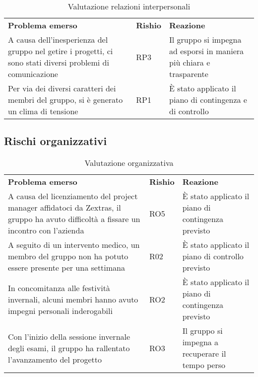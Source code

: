     \begin{table}[h]
        \begin{adjustbox}{width=\textwidth}
            \centering
            \renewcommand{\arraystretch}{1.1}
            \begin{tabular}{>{\centering\arraybackslash} m{5cm} >{\centering\arraybackslash} m{1.5cm} >{\centering\arraybackslash} m{4cm}}
                \rowcolor[HTML]{bfbfbf} 
                \textbf{Problema emerso} & \textbf{Rishio} & \textbf{Reazione} \\
                A causa dell'inesperienza del gruppo nel getire i progetti, ci sono stati diversi problemi di comunicazione & RP3 & Il gruppo si impegna ad esporsi in maniera più chiara e trasparente \\
                Per via dei diversi caratteri dei membri del gruppo, si è generato un clima di tensione & RP1 &  È stato applicato il piano di contingenza e di controllo \\
            \end{tabular}
        \end{adjustbox}
        \caption{Valutazione relazioni interpersonali}
    \end{table}
    \clearpage

\subsection{Rischi organizzativi}
    \begin{table}[h]
        \begin{adjustbox}{width=\textwidth}
            \centering
            \renewcommand{\arraystretch}{1.1}
            \begin{tabular}{>{\centering\arraybackslash} m{5cm} >{\centering\arraybackslash} m{1.5cm} >{\centering\arraybackslash} m{4cm}}
                \rowcolor[HTML]{bfbfbf} 
                \textbf{Problema emerso} & \textbf{Rishio} & \textbf{Reazione} \\
                A causa del licenziamento del project manager affidatoci da Zextras, il gruppo ha avuto difficoltà a fissare un incontro con l'azienda & RO5 & È stato applicato il piano di contingenza previsto \\
                A seguito di un intervento medico, un membro del gruppo non ha potuto essere presente per una settimana & R02 & È stato applicato il piano di controllo previsto\\
                In concomitanza alle festività invernali, alcuni membri hanno avuto impegni personali inderogabili & RO2 & È stato applicato il piano di contingenza previsto \\
                Con l'inizio della sessione invernale degli esami, il gruppo ha rallentato l'avanzamento del progetto & RO3 & Il gruppo si impegna a recuperare il tempo perso
            \end{tabular}
        \end{adjustbox}
        \caption{Valutazione organizzativa}
    \end{table}

